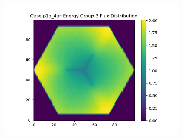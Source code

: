 \documentclass[letterpaper,11pt]{report}
\begin{document}
\begin{figure}[H]
\begin{subfigure}{.33\textwidth}
            \includegraphics[width=1.1\linewidth]{../../phase1a/case4ar/analysis_output/p1a_4ar_e_eg3.png}
            \caption{}
          \end{subfigure}
        \caption{}
        \label{fig:test}
        \end{figure}
\end{document}
